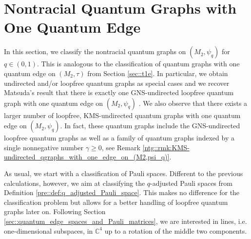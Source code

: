 \documentclass{amsart}
\newcommand{\C}{\mathbb{C}}
\begin{document}
\section{Nontracial Quantum Graphs with One Quantum Edge}
\label{sec::n1e}




In this section, we classify the nontracial quantum graphs on $(M_2, \psi_q)$ for $q \in (0,1)$. This is analogous to the classification of quantum graphs with one quantum edge on $(M_2, \tau)$ from Section \ref{sec::t1e}. In particular, we obtain undirected and/or loopfree quantum graphs as special cases and we recover Matsuda's result that there is exactly one GNS-undirected loopfree quantum graph with one quantum edge on $(M_2, \psi_q)$ \cite{matsuda_classification_2022}. We also observe that there exists a larger number of loopfree, KMS-undirected quantum graphs with one quantum edge on $(M_2, \psi_q)$. In fact, these quantum graphs include the GNS-undirected loopfree quantum graphs as well as a family of quantum graphs indexed by a single nonnegative number $\gamma \geq 0$, see Remark \ref{ntg::rmk:KMS-undirected_qgraphs_with_one_edge_on_(M2,psi_q)}.

As usual, we start with a classification of Pauli spaces. Different to the previous calculations, however, we aim at classifying the $q$-adjusted Pauli spaces from Definition \ref{pre::def:q_adjusted_Pauli_space}. This makes no difference for the classification problem but allows for a better handling of loopfree quantum graphs later on. Following Section \ref{sec::quantum_edge_spaces_and_Pauli_matrices}, we are interested in lines, i.e. one-dimensional subspaces, in $\C^4$ up to a rotation of the middle two components.
\end{document}
